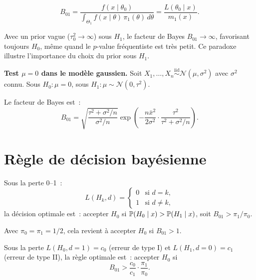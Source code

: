 \begin{theoreme}
\[
  B_{01} = \frac{f(x \mid \theta_0)}
  {\int_{\Theta_1} f(x \mid \theta)\,\pi_1(\theta)\,d\theta}
  = \frac{L(\theta_0 \mid x)}{m_1(x)}.
\]
\end{theoreme}

\begin{attention}[title=\textbf{Paradoxe de Jeffreys--Lindley}]
Avec un prior vague ($\tau_0^2 \to \infty$) sous $H_1$, le facteur de
Bayes $B_{01} \to \infty$, favorisant toujours $H_0$, m\^eme quand le
$p$-value fr\'equentiste est tr\`es petit. Ce paradoxe illustre
l'importance du choix du prior sous $H_1$.
\end{attention}

\begin{exemple}
\textbf{Test $\mu = 0$ dans le mod\`ele gaussien.}
Soit $X_1, \ldots, X_n \overset{\text{iid}}{\sim} \mathcal{N}(\mu, \sigma^2)$
avec $\sigma^2$ connu. Sous $H_0 : \mu = 0$, sous $H_1 : \mu \sim \mathcal{N}(0, \tau^2)$.

Le facteur de Bayes est~:
\[
  B_{01} = \sqrt{\frac{\tau^2 + \sigma^2/n}{\sigma^2/n}}
  \exp\!\left(-\frac{n\bar{x}^2}{2\sigma^2}
  \cdot \frac{\tau^2}{\tau^2 + \sigma^2/n}\right).
\]
\end{exemple}

\section{R\`egle de d\'ecision bay\'esienne}

\begin{definition}
Sous la perte 0--1~:
\[
  L(H_k, d) = \begin{cases}
  0 & \text{si } d = k, \\
  1 & \text{si } d \neq k,
  \end{cases}
\]
la d\'ecision optimale est~: accepter $H_0$ si
$\mathbb{P}(H_0 \mid x) > \mathbb{P}(H_1 \mid x)$, soit $B_{01} > \pi_1/\pi_0$.

Avec $\pi_0 = \pi_1 = 1/2$, cela revient \`a accepter $H_0$ si $B_{01} > 1$.
\end{definition}

\begin{theoreme}
Sous la perte
$L(H_0, d=1) = c_0$ (erreur de type I) et $L(H_1, d=0) = c_1$ (erreur de type II),
la r\`egle optimale est~: accepter $H_0$ si
\[
  B_{01} > \frac{c_0}{c_1} \cdot \frac{\pi_1}{\pi_0}.
\]
\end{theoreme}

